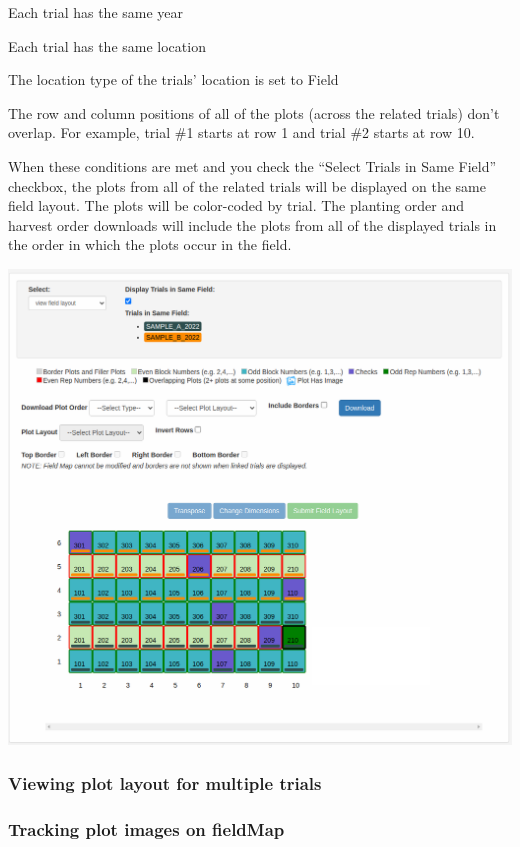 \documentclass[
  12pt,
]{book}
\begin{document}
Each trial has the same year

Each trial has the same location

The location type of the trials' location is set to Field

The row and column positions of all of the plots (across the related trials) don't overlap. For example, trial \#1 starts at row 1 and trial \#2 starts at row 10.

When these conditions are met and you check the ``Select Trials in Same Field'' checkbox, the plots from all of the related trials will be displayed on the same field layout. The plots will be color-coded by trial. The planting order and harvest order downloads will include the plots from all of the displayed trials in the order in which the plots occur in the field.

\begin{center}\includegraphics[width=0.95\linewidth]{assets/images/fieldmap_multi_trial_layout} \end{center}

\hypertarget{viewing-plot-layout-for-multiple-trials}{%
\subsubsection{Viewing plot layout for multiple trials}\label{viewing-plot-layout-for-multiple-trials}}

\hypertarget{tracking-plot-images-on-fieldmap}{%
\subsubsection*{Tracking plot images on fieldMap}\label{tracking-plot-images-on-fieldmap}}
\end{document}
